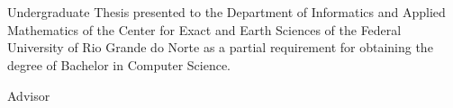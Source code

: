 \begin{titlepage}
  \begin{center}
    {\bfseries\large \thesisAuthor}\\[3cm]

    {\Large\bfseries \thesisTitle}\\[3cm]

    \begin{flushright}
      \begin{minipage}{0.5\textwidth}
        \normalsize
        Undergraduate Thesis presented to the Department of Informatics and Applied Mathematics of the Center for Exact and Earth Sciences of the Federal University of Rio Grande do Norte as a partial requirement for obtaining the degree of Bachelor in Computer Science.

        \vspace{1cm}

      \end{minipage}
    \end{flushright}

    \vspace{1cm}

    Advisor\\ \thesisAdvisor{}

    \vfill

    \normalsize \ufrn\\[0.1cm]
    \normalsize \dimap\\[1cm]

    \vspace{1cm}

    \small \thesisCity\\[0.1cm]
    \small \thesisMonth{} \thesisYear{}
  \end{center}
\end{titlepage}